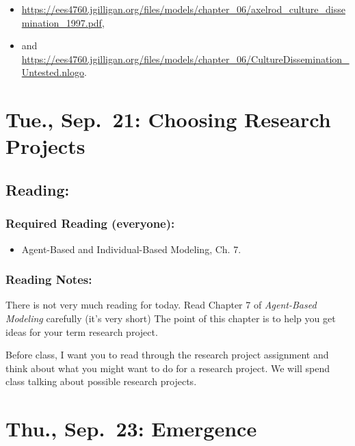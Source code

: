 \documentclass[
]{article}
\providecommand{\tightlist}{%
  \setlength{\itemsep}{0pt}\setlength{\parskip}{0pt}}
\begin{document}
\begin{itemize}
\tightlist
\item
  \url{https://ees4760.jgilligan.org/files/models/chapter_06/axelrod_culture_dissemination_1997.pdf},
\item
  and
  \url{https://ees4760.jgilligan.org/files/models/chapter_06/CultureDissemination_Untested.nlogo}.
\end{itemize}

\hypertarget{tue.-sep.-21-choosing-research-projects}{%
\section{Tue., Sep.~21: Choosing Research
Projects}\label{tue.-sep.-21-choosing-research-projects}}

\hypertarget{reading-7}{%
\subsection{Reading:}\label{reading-7}}

\hypertarget{required-reading-everyone-6}{%
\subsubsection{Required Reading
(everyone):}\label{required-reading-everyone-6}}

\begin{itemize}
\tightlist
\item
  Agent-Based and Individual-Based Modeling, Ch. 7.
\end{itemize}

\hypertarget{reading-notes-6}{%
\subsubsection{Reading Notes:}\label{reading-notes-6}}

There is not very much reading for today. Read Chapter 7 of
\emph{Agent-Based Modeling} carefully (it's very short) The point of
this chapter is to help you get ideas for your term research project.

Before class, I want you to read through the research project assignment
and think about what you might want to do for a research project. We
will spend class talking about possible research projects.

\hypertarget{thu.-sep.-23-emergence}{%
\section{Thu., Sep.~23: Emergence}\label{thu.-sep.-23-emergence}}
\end{document}
